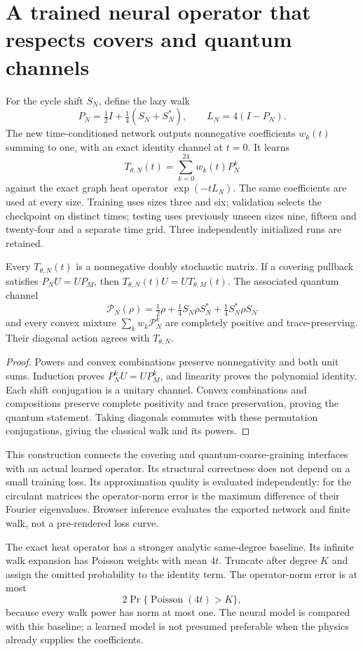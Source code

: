 \section{A trained neural operator that respects covers and quantum channels}
For the cycle shift $S_N$, define the lazy walk
\[
 P_N=\tfrac12 I+\tfrac14(S_N+S_N^*),\qquad L_N=4(I-P_N).
\]
The new time-conditioned network outputs nonnegative coefficients $w_k(t)$ summing to one, with an exact identity channel at $t=0$. It learns
\[
 T_{\theta,N}(t)=\sum_{k=0}^{24}w_k(t)P_N^k
\]
against the exact graph heat operator $\exp(-tL_N)$. The same coefficients are used at every size. Training uses sizes three and six; validation selects the checkpoint on distinct times; testing uses previously unseen sizes nine, fifteen and twenty-four and a separate time grid. Three independently initialized runs are retained.

\begin{proposition}
Every $T_{\theta,N}(t)$ is a nonnegative doubly stochastic matrix. If a covering pullback satisfies $P_NU=UP_M$, then $T_{\theta,N}(t)U=UT_{\theta,M}(t)$. The associated quantum channel
\[
 \mathcal P_N(\rho)=\tfrac12\rho+
 \tfrac14S_N\rho S_N^*+\tfrac14S_N^*\rho S_N
\]
and every convex mixture $\sum_kw_k\mathcal P_N^k$ are completely positive and trace-preserving. Their diagonal action agrees with $T_{\theta,N}$.
\end{proposition}
\begin{proof}
Powers and convex combinations preserve nonnegativity and both unit sums. Induction proves $P_N^kU=UP_M^k$, and linearity proves the polynomial identity. Each shift conjugation is a unitary channel. Convex combinations and compositions preserve complete positivity and trace preservation, proving the quantum statement. Taking diagonals commutes with these permutation conjugations, giving the classical walk and its powers.
\end{proof}

This construction connects the covering and quantum-coarse-graining interfaces with an actual learned operator. Its structural correctness does not depend on a small training loss. Its approximation quality is evaluated independently: for the circulant matrices the operator-norm error is the maximum difference of their Fourier eigenvalues. Browser inference evaluates the exported network and finite walk, not a pre-rendered loss curve.

The exact heat operator has a stronger analytic same-degree baseline. Its infinite walk expansion has Poisson weights with mean $4t$. Truncate after degree $K$ and assign the omitted probability to the identity term. The operator-norm error is at most
\[
 2\Pr\{\operatorname{Poisson}(4t)>K\},
\]
because every walk power has norm at most one. The neural model is compared with this baseline; a learned model is not presumed preferable when the physics already supplies the coefficients.

